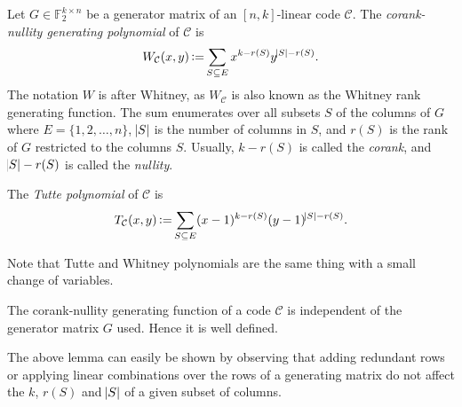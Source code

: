 
\begin{definition}
    Let $G\in\mathbb{F}_2^{k\times n}$ be a generator matrix of an $[n,k]$-linear code $\mathcal{C}$. The \textit{corank-nullity generating polynomial} of $\mathcal{C}$ is
    \begin{equation}
        W_\mathcal{C}(x,y) \operatorname{\vcentcolon=} \sum_{S\subseteq E}x^{k-r(S)}y^{\abs{S}-r(S)}.
    \end{equation}
    The notation $W$ is after Whitney, as $W_\mathcal{C}$ is also known as the Whitney rank generating function. The sum enumerates over all subsets $S$ of the columns of $G$ where $E=\{1,2,\ldots,n\}$, $\abs{S}$ is the number of columns in $S$, and $r(S)$ is the rank of $G$ restricted to the columns $S$. Usually, $k-r(S)$ is called the \textit{corank}, and $\abs{S}-r(S)$ is called the \textit{nullity}.
\end{definition}

\begin{definition}
    The \textit{Tutte polynomial} of $\mathcal{C}$ is
    \begin{equation}
        T_\mathcal{C}(x,y) \operatorname{\vcentcolon=} \sum_{S\subseteq E}(x-1)^{k-r(S)}(y-1)^{\abs{S}-r(S)}.
    \end{equation}
\end{definition}
Note that Tutte and Whitney polynomials are the same thing with a small change of variables.

\begin{lemma}
    The corank-nullity generating function of a code $\mathcal{C}$ is independent of the generator matrix $G$ used. Hence it is well defined.
\end{lemma}
The above lemma can easily be shown by observing that adding redundant rows or applying linear combinations over the rows of a generating matrix do not affect the $k$, $r(S)$ and $\abs{S}$ of a given subset of columns.

